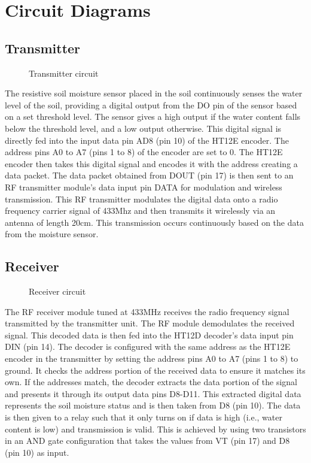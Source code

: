 \chapter{Circuit Diagrams}

\section{Transmitter}
\begin{figure}[ht]
	\centering
	\caption{Transmitter circuit}
\end{figure}

The resistive soil moisture sensor placed in the soil continuously
senses the water level of the soil, providing a digital output from
the DO pin of the sensor based on a set threshold level. The sensor
gives a high output if the water content falls below the threshold
level, and a low output otherwise. This digital signal is directly
fed into the input data pin AD8 (pin 10) of the HT12E encoder. The
address pins A0 to A7 (pins 1 to 8) of the encoder are set to 0. The
HT12E encoder then takes this digital signal and encodes it with the
address creating a data packet. The data packet obtained from DOUT
(pin 17) is then sent to an RF transmitter module's data input pin
DATA for modulation and wireless transmission. This RF transmitter
modulates the digital data onto a radio frequency carrier signal of
433Mhz and then transmits it wirelessly via an antenna of length
20cm. This transmission occurs continuously based on the data from
the moisture sensor.


\section{Receiver}
\begin{figure}[ht]
	\centering
	\caption{Receiver circuit}
\end{figure}

The RF receiver module tuned at 433MHz receives the radio frequency
signal transmitted by the transmitter unit. The RF module demodulates
the received signal. This decoded data is then fed into the HT12D
decoder's data input pin DIN (pin 14). The decoder is configured with
the same address as the HT12E encoder in the transmitter by setting
the address pins A0 to A7 (pins 1 to 8) to ground. It checks the
address portion of the received data to ensure it matches its own. If
the addresses match, the decoder extracts the data portion of the
signal and presents it through its output data pins D8-D11. This
extracted digital data represents the soil moisture status and is
then taken from D8 (pin 10). The data is then given to a relay such
that it only turns on if data is high (i.e., water content is low)
and transmission is valid. This is achieved by using two transistors
in an AND gate configuration that takes the values from VT (pin 17)
and D8 (pin 10) as input.

